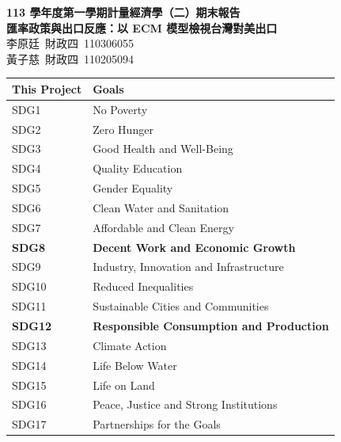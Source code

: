 \documentclass[a4paper,12pt]{article}
\renewcommand{\arraystretch}{1.5}
\begin{document}
\begin{center}
    \textbf{\Large 113 學年度第一學期計量經濟學（二）期末報告}\\
    \vspace{1.5cm}
    \textbf{\Large 匯率政策與出口反應：以 ECM 模型檢視台灣對美出口}\\
    \vspace{1cm}
    \Large 李原廷\ 財政四\ 110306055 \\
    \Large 黃子慈\ 財政四\ 110205094 \\
\end{center}

\vspace{0.5cm}

\begin{table}[h!]
    \centering
    \renewcommand{\arraystretch}{1.5}
    \setlength{\arrayrulewidth}{0.5mm}
    \setlength{\tabcolsep}{5pt}
    \begin{tabular}{|p{4cm}|p{8cm}|}
        \hline
        \textbf{This Project} & \textbf{Goals} \\ \hline
        SDG1 & No Poverty \\ \hline
        SDG2 & Zero Hunger \\ \hline
        SDG3 & Good Health and Well-Being \\ \hline
        SDG4 & Quality Education \\ \hline
        SDG5 & Gender Equality \\ \hline
        SDG6 & Clean Water and Sanitation \\ \hline
        SDG7 & Affordable and Clean Energy \\ \hline
        \textbf{SDG8} & \textbf{Decent Work and Economic Growth} \\ \hline
        SDG9 & Industry, Innovation and Infrastructure \\ \hline
        SDG10 & Reduced Inequalities \\ \hline
        SDG11 & Sustainable Cities and Communities \\ \hline
        \textbf{SDG12} & \textbf{Responsible Consumption and Production} \\ \hline
        SDG13 & Climate Action \\ \hline
        SDG14 & Life Below Water \\ \hline
        SDG15 & Life on Land \\ \hline
        SDG16 & Peace, Justice and Strong Institutions \\ \hline
        SDG17 & Partnerships for the Goals \\ \hline
    \end{tabular}
\end{table}
\thispagestyle{empty}
\end{document}
